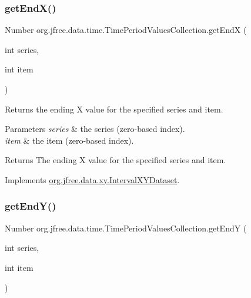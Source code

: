 \subsubsection{\texorpdfstring{get\+End\+X()}{getEndX()}}
{\footnotesize\ttfamily Number org.\+jfree.\+data.\+time.\+Time\+Period\+Values\+Collection.\+get\+EndX (\begin{DoxyParamCaption}\item[{int}]{series,  }\item[{int}]{item }\end{DoxyParamCaption})}

Returns the ending X value for the specified series and item.


\begin{DoxyParams}{Parameters}
{\em series} & the series (zero-\/based index). \\
\hline
{\em item} & the item (zero-\/based index).\\
\hline
\end{DoxyParams}
\begin{DoxyReturn}{Returns}
The ending X value for the specified series and item. 
\end{DoxyReturn}


Implements \mbox{\hyperlink{interfaceorg_1_1jfree_1_1data_1_1xy_1_1_interval_x_y_dataset_a93161a6d6c1db37cfac030239c62ab0a}{org.\+jfree.\+data.\+xy.\+Interval\+X\+Y\+Dataset}}.

\mbox{\label{classorg_1_1jfree_1_1data_1_1time_1_1_time_period_values_collection_a79bc6031731fb19cb9c1aa7fd605a951}} 
\subsubsection{\texorpdfstring{get\+End\+Y()}{getEndY()}}
{\footnotesize\ttfamily Number org.\+jfree.\+data.\+time.\+Time\+Period\+Values\+Collection.\+get\+EndY (\begin{DoxyParamCaption}\item[{int}]{series,  }\item[{int}]{item }\end{DoxyParamCaption})}

